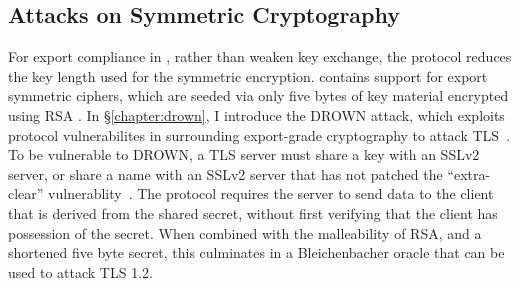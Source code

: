\subsection{Attacks on Symmetric Cryptography}

For export compliance in \ssltwo, rather than weaken key exchange, the
protocol reduces the key length used for the symmetric encryption.
\ssltwo contains support for export symmetric ciphers, which are seeded via
only five bytes of key material encrypted using RSA \PKCS. In
\S\ref{chapter:drown}, I introduce the DROWN attack, which exploits protocol
vulnerabilites in \ssltwo surrounding export-grade cryptography to attack
TLS~\cite{drown-2016}. To be vulnerable to DROWN, a TLS server must share a
key with an SSLv2 server, or share a name with an SSLv2 server that has not
patched the ``extra-clear'' vulnerablity~\cite{drown-2016,cve-2016-0701}.
The \ssltwo protocol requires the server to send data to the client that is
derived from the shared secret, without first verifying that the client has
possession of the secret. When combined with the malleability of RSA, and a
shortened five byte secret, this culminates in a Bleichenbacher oracle that
can be used to attack TLS 1.2.

% 
% 

